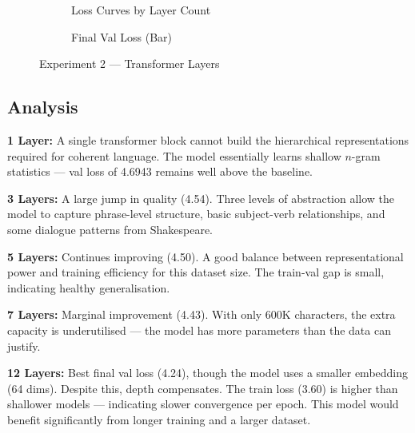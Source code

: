 \documentclass[12pt,a4paper]{article}
\begin{document}
\begin{figure}[H]
  \centering
  \begin{subfigure}{0.60\textwidth}
    \caption{Loss Curves by Layer Count}
  \end{subfigure}
  \hfill
  \begin{subfigure}{0.36\textwidth}
    \caption{Final Val Loss (Bar)}
  \end{subfigure}
  \caption{Experiment 2 — Transformer Layers}
\end{figure}

\subsection{Analysis}

\textbf{1 Layer:} A single transformer block cannot build the hierarchical representations required for coherent language. The model essentially learns shallow $n$-gram statistics — val loss of 4.6943 remains well above the baseline.

\textbf{3 Layers:} A large jump in quality (4.54). Three levels of abstraction allow the model to capture phrase-level structure, basic subject-verb relationships, and some dialogue patterns from Shakespeare.

\textbf{5 Layers:} Continues improving (4.50). A good balance between representational power and training efficiency for this dataset size. The train-val gap is small, indicating healthy generalisation.

\textbf{7 Layers:} Marginal improvement (4.43). With only 600K characters, the extra capacity is underutilised — the model has more parameters than the data can justify.

\textbf{12 Layers:} Best final val loss (4.24), though the model uses a smaller embedding (64 dims). Despite this, depth compensates. The train loss (3.60) is higher than shallower models — indicating slower convergence per epoch. This model would benefit significantly from longer training and a larger dataset.
\end{document}

